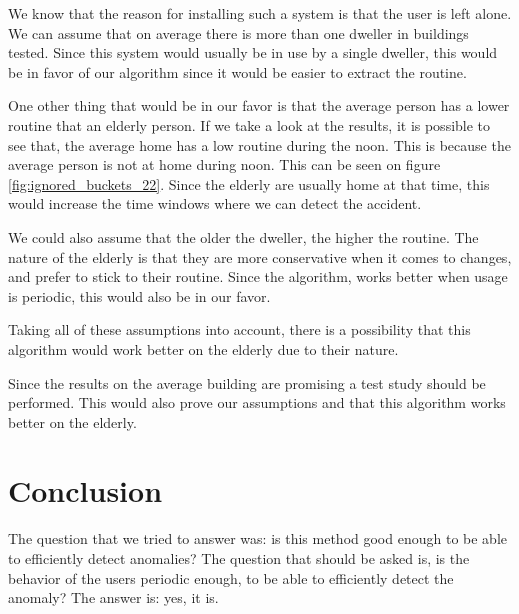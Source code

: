 We know that the reason for installing such a system is that the user is left alone.
We can assume that on average there is more than one dweller in buildings tested.
Since this system would usually be in use by a single dweller,
this would be in favor of our algorithm since it would be 
easier to extract the routine.

One other thing that would be in our favor is that the average person has a lower routine that an elderly person. 
If we take a look at the results, it is possible to see that,
the average home has a low routine during the noon. 
This is because the average person is not at home during noon.
This can be seen on figure \ref{fig:ignored_buckets_22}.
Since the elderly are usually home at that time, this would 
increase the time windows where we can detect the accident.

We could also assume that the older the dweller, the higher the routine. 
The nature of the elderly is that they are more conservative when it comes to changes, and prefer to stick to their routine.
Since the algorithm, works better when usage is periodic, this would also be in our favor. 

Taking all of these assumptions into account, 
there is a possibility that this algorithm would work 
better on the elderly due to their nature.

Since the results on the average building are promising
a test study should be performed. 
This would also prove our assumptions and that this algorithm works 
better on the elderly.


\section{Conclusion}

The question that we tried to answer was:
is this method good enough to be able to efficiently detect anomalies? 
The question that should be asked is,
is the behavior of the users periodic enough, to 
be able to efficiently detect the anomaly?
The answer is: yes, it is.